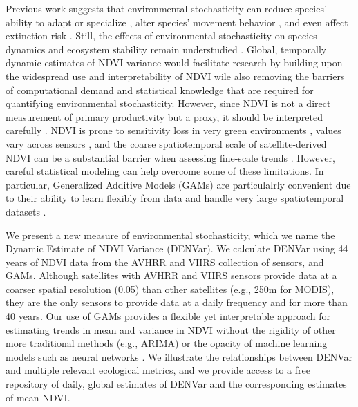 \documentclass{article}
\begin{document}
Previous work suggests that environmental stochasticity can reduce species' ability to adapt or specialize \citep{chevin_adaptation_2010}, alter species' movement behavior \citep{mezzini_how_2025}, and even affect extinction risk \citep{lande_risks_1993, bull_metapopulation_2007, fung_quantifying_2018}. Still, the effects of environmental stochasticity on species dynamics and ecosystem stability remain understudied \citep{marcus_changing_2023}. Global, temporally dynamic estimates of NDVI variance would facilitate research by building upon the widespread use and interpretability of NDVI wile also removing the barriers of computational demand and statistical knowledge that are required for quantifying environmental stochasticity. However, since NDVI is not a direct measurement of primary productivity but a proxy, it should be interpreted carefully \citep{pettorelli_normalized_2011}. NDVI is prone to sensitivity loss in very green environments \citep{matsushita_sensitivity_2007, son_comparative_2014}, values vary across sensors \citep{beck_global_2011, fan_global_2016, huang_commentary_2021}, and the coarse spatiotemporal scale of satellite-derived NDVI can be a substantial barrier when assessing fine-scale trends \citep{goodchild_scale_2023, reid_its_2018}. However, careful statistical modeling can help overcome some of these limitations. In particular, Generalized Additive Models (GAMs) are particulalrly convenient due to their ability to learn flexibly from data \citep{wood_generalized_2017} and handle very large spatiotemporal datasets \citep{wood_generalized_2015, wood_generalized_2017-1}.

We present a new measure of environmental stochasticity, which we name the Dynamic Estimate of NDVI Variance (DENVar). We calculate DENVar using 44 years of NDVI data from the AVHRR and VIIRS collection of sensors, and GAMs. Although satellites with AVHRR and VIIRS sensors provide data at a coarser spatial resolution (0.05\textdegree) than other satellites (e.g., 250m for MODIS), they are the only sensors to provide data at a daily frequency and for more than 40 years. Our use of GAMs provides a flexible yet interpretable approach for estimating trends in mean and variance in NDVI without the rigidity of other more traditional methods (e.g., ARIMA) or the opacity of machine learning models such as neural networks \citep{simpson_modelling_2018, wood_generalized_2017}. We illustrate the relationships between DENVar and multiple relevant ecological metrics, and we provide access to a free repository of daily, global estimates of DENVar and the corresponding estimates of mean NDVI.
\end{document}

